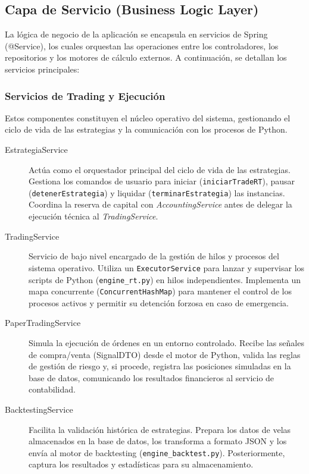\documentclass[12pt, letterpaper]{article}
\begin{document}
\subsection{Capa de Servicio (Business Logic Layer)}

La lógica de negocio de la aplicación se encapsula en servicios de Spring (@Service), los cuales orquestan las operaciones entre los controladores, los repositorios y los motores de cálculo externos. A continuación, se detallan los servicios principales:

\subsubsection{Servicios de Trading y Ejecución}
Estos componentes constituyen el núcleo operativo del sistema, gestionando el ciclo de vida de las estrategias y la comunicación con los procesos de Python.

\begin{description}
    \item[EstrategiaService] Actúa como el orquestador principal del ciclo de vida de las estrategias. Gestiona los comandos de usuario para iniciar (\texttt{iniciarTradeRT}), pausar (\texttt{detenerEstrategia}) y liquidar (\texttt{terminarEstrategia}) las instancias. Coordina la reserva de capital con \textit{AccountingService} antes de delegar la ejecución técnica al \textit{TradingService}.

    \item[TradingService] Servicio de bajo nivel encargado de la gestión de hilos y procesos del sistema operativo. Utiliza un \texttt{ExecutorService} para lanzar y supervisar los scripts de Python (\texttt{engine\_rt.py}) en hilos independientes. Implementa un mapa concurrente (\texttt{ConcurrentHashMap}) para mantener el control de los procesos activos y permitir su detención forzosa en caso de emergencia.

    \item[PaperTradingService] Simula la ejecución de órdenes en un entorno controlado. Recibe las señales de compra/venta (SignalDTO) desde el motor de Python, valida las reglas de gestión de riesgo y, si procede, registra las posiciones simuladas en la base de datos, comunicando los resultados financieros al servicio de contabilidad.

    \item[BacktestingService] Facilita la validación histórica de estrategias. Prepara los datos de velas almacenados en la base de datos, los transforma a formato JSON y los envía al motor de backtesting (\texttt{engine\_backtest.py}). Posteriormente, captura los resultados y estadísticas para su almacenamiento.
\end{description}
\end{document}
